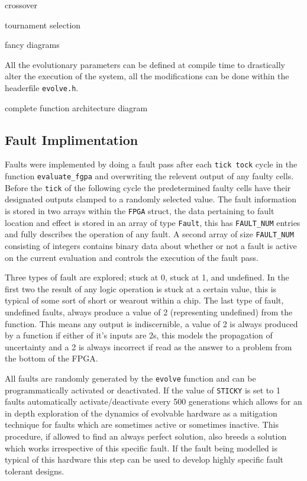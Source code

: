 \todo crossover

\todo tournament selection

\todo fancy diagrams

All the evolutionary parameters can be defined at compile time to drastically
alter the execution of the system, all the modifications can be done within
the headerfile \texttt{evolve.h}.

\todo complete function architecture diagram

\subsection{Fault Implimentation}
Faults were implemented by doing a fault pass after each \texttt{tick tock} cycle in
the function \texttt{evaluate\_fgpa} and
overwriting the relevent output of any faulty cells. Before the \texttt{tick} of the
following cycle the predetermined faulty cells have their designated outputs
clamped to a randomly selected value. The fault information is stored in
two arrays within the \texttt{FPGA} struct, the data pertaining to fault
location and effect is stored in an array of type \texttt{Fault}, this has
\texttt{FAULT\_NUM} entries and fully describes the operation of any fault.
A second array of size \texttt{FAULT\_NUM} consisting of integers contains
binary data about whether or not a fault is active on the current evaluation
and controls the execution of the fault pass.

Three types of fault are explored; stuck at 0, stuck at 1, and undefined. In
the first two the result of any logic operation is stuck at a certain value, this
is typical of some sort of short or wearout within a chip. The last type of fault,
undefined faults, always produce a value of 2 (representing undefined) from the function. This means any
output is indiscernible, a value of 2 is always produced by a function if either
of it's inputs are 2s, this models the propagation of uncertainty and a 2 is always
incorrect if read as the answer to a problem from the bottom of the FPGA.

All faults are randomly generated by the \texttt{evolve} function and can be
programmatically activated or deactivated. If the value of \texttt{STICKY} is
set to 1 faults automatically activate/deactivate every 500 generations which
allows for an in depth exploration of the dynamics of evolvable hardware as a
mitigation technique for faults which are sometimes active or sometimes inactive.
This procedure, if allowed to find an always perfect solution, also breeds a solution
which works irrespective of this specific fault. If the fault being modelled is
typical of this hardware this step can be used to develop highly specific
fault tolerant designs.

